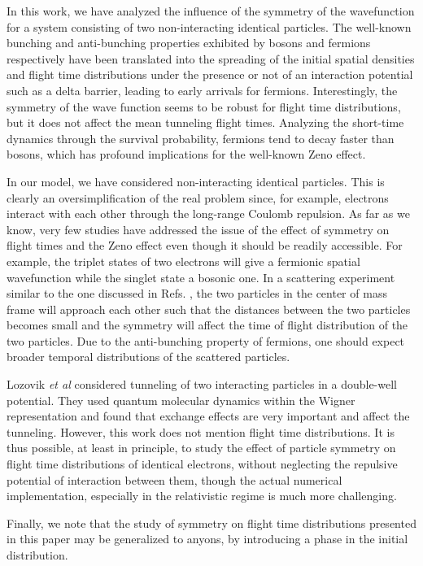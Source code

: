 \documentclass[preprint,aps]{revtex4}
\begin{document}
In this work, we have analyzed the influence of the symmetry of the wavefunction for a system consisting of two non-interacting identical particles. The well-known bunching and anti-bunching properties exhibited by bosons and fermions respectively have been translated into the spreading of the initial spatial densities and flight time distributions under the presence or not of an interaction potential such as a delta barrier, leading to early arrivals for fermions. Interestingly, the symmetry of the wave function seems to be robust for flight time distributions, but it does not affect the mean tunneling flight times. Analyzing the short-time dynamics through the survival probability, fermions tend to decay faster than bosons, which has profound implications for the well-known Zeno effect.

In our model, we have considered non-interacting identical particles. This is clearly an oversimplification of the real problem since, for example, electrons interact with each other through the long-range Coulomb repulsion. As far as we know, very few studies have addressed the issue of the effect of symmetry on flight times and the Zeno effect even though it should be readily accessible. For example, the triplet states of two electrons will give a fermionic spatial wavefunction while the singlet state a bosonic one. In a scattering experiment similar to the one discussed in Refs. \cite{grossmann2014,buchholz2018}, the two particles in the center of mass frame will approach each other such that the distances between the two particles becomes small and the symmetry will affect the time of flight distribution of the two particles. Due to the anti-bunching property of fermions, one should expect broader temporal distributions of the scattered particles.  

Lozovik {\it et al} \cite{Filinov2} considered tunneling of two interacting particles in a double-well potential. They used quantum molecular dynamics within the Wigner representation and found that exchange effects are very important and affect the tunneling. However, this work does not mention flight time distributions. It is thus possible, at least in principle, to study the effect of particle symmetry on flight time distributions of identical electrons, without neglecting the repulsive potential of interaction between them, though the actual numerical implementation, especially in the relativistic regime is much more challenging. 

Finally, we note that  the study of symmetry on flight time distributions presented in this paper may be generalized to anyons, by introducing a phase in the initial distribution.
\end{document}
